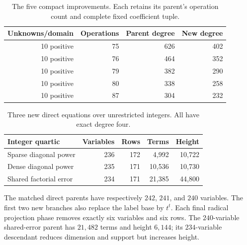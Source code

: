 \begin{table}[ht]\centering\small
\begin{tabular}{@{}rrrr@{}}\toprule
Unknowns/domain & Operations & Parent degree & New degree\\\midrule
10 positive & 75 & 626 & 402\\
10 positive & 76 & 464 & 352\\
10 positive & 79 & 382 & 290\\
10 positive & 80 & 338 & 258\\
10 positive & 87 & 304 & 232\\
\bottomrule\end{tabular}
\caption{The five compact improvements. Each retains its parent's operation count and complete fixed coefficient tuple.}\label{tab:compact}
\end{table}
\begin{table}[ht]\centering\small
\begin{tabular}{@{}lrrrr@{}}\toprule
Integer quartic & Variables & Rows & Terms & Height\\\midrule
Sparse diagonal power & 236 & 172 & 4,992 & 10,722\\
Dense diagonal power & 235 & 171 & 10,536 & 10,730\\
Shared factorial error & 234 & 171 & 21,385 & 44,800\\
\bottomrule\end{tabular}
\caption{Three new direct equations over unrestricted integers. All have exact degree four.}\label{tab:direct}
\end{table}
The matched direct parents have respectively $242$, $241$, and $240$ variables.
The first two new branches also replace the label base by $t^t$.
Each final radical projection phase removes exactly six variables and six rows.
The $240$-variable shared-error parent has $21{,}482$ terms and height $6{,}144$;
its $234$-variable descendant reduces dimension and support but increases height.
